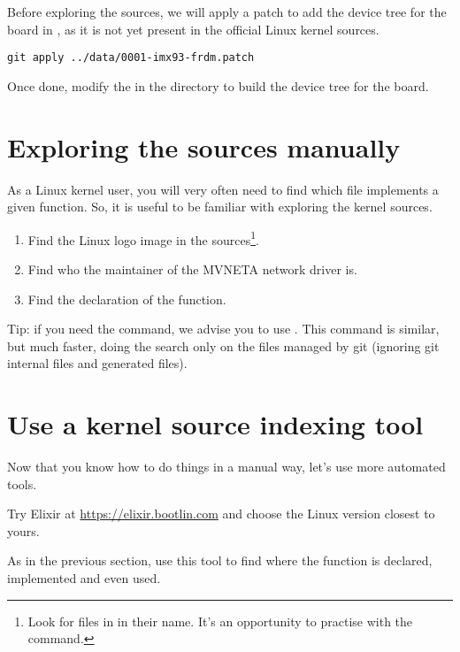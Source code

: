 \if{}
Before exploring the sources, we will apply a patch to add the device
tree for the  board in , as it is not yet present in the official Linux kernel sources.
\begin{verbatim}
git apply ../data/0001-imx93-frdm.patch
\end{verbatim}
Once done, modify the  in the  directory to build
the device tree for the  board.
\fi

\section{Exploring the sources manually}

As a Linux kernel user, you will very often need to find which file
implements a given function. So, it is useful to be familiar with
exploring the kernel sources.

\begin{enumerate}
\item Find the Linux logo image in the sources\footnote{Look for
      files in  in their name. It's an
      opportunity to practise with the  command.}.
\item Find who the maintainer of the MVNETA network driver is.
\item Find the declaration of the  function.
\end{enumerate}

Tip: if you need the  command, we advise you to use . This command is similar, but much faster, doing the search only
on the files managed by git (ignoring git internal files and generated
files).

\section{Use a kernel source indexing tool}

Now that you know how to do things in a manual way, let's use more
automated tools.

Try Elixir at \url{https://elixir.bootlin.com}
and choose the Linux version closest to yours.

As in the previous section, use this tool to find where
the  function is declared, implemented and
even used.
